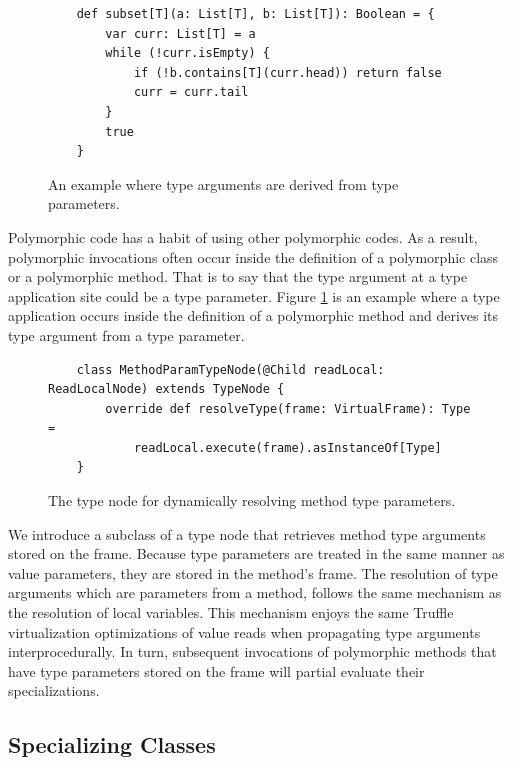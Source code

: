 \begin{figure}[!htb]
	\begin{verbatim}
	def subset[T](a: List[T], b: List[T]): Boolean = {
		var curr: List[T] = a
		while (!curr.isEmpty) {
			if (!b.contains[T](curr.head)) return false
			curr = curr.tail
		}
		true 
	}
	\end{verbatim}
	\caption{An example where type arguments are derived from type parameters.}
	\label{impl:list-subset}
\end{figure}

Polymorphic code has a habit of using other polymorphic codes.
As a result, polymorphic invocations often occur inside the definition of a polymorphic class or a polymorphic method.
That is to say that the type argument at a type application site could be a type parameter.
Figure \ref{impl:list-subset} is an example where a type application occurs inside the definition of a polymorphic method and derives its type argument from a type parameter.

\begin{figure}[!htb]
	\begin{verbatim}
	class MethodParamTypeNode(@Child readLocal: ReadLocalNode) extends TypeNode {
		override def resolveType(frame: VirtualFrame): Type = 
			readLocal.execute(frame).asInstanceOf[Type]
	}
	\end{verbatim}
	\caption{The type node for dynamically resolving method type parameters.}
	\label{impl:method-param-typenode}
\end{figure}

We introduce a subclass of a type node that retrieves method type arguments stored on the frame.
Because type parameters are treated in the same manner as value parameters, they are stored in the method's frame.
The resolution of type arguments which are parameters from a method, follows the same mechanism as the resolution of local variables.
This mechanism enjoys the same Truffle virtualization optimizations of value reads when propagating type arguments interprocedurally.
In turn, subsequent invocations of polymorphic methods that have type parameters stored on the frame will partial evaluate their specializations.

\subsection{Specializing Classes}

